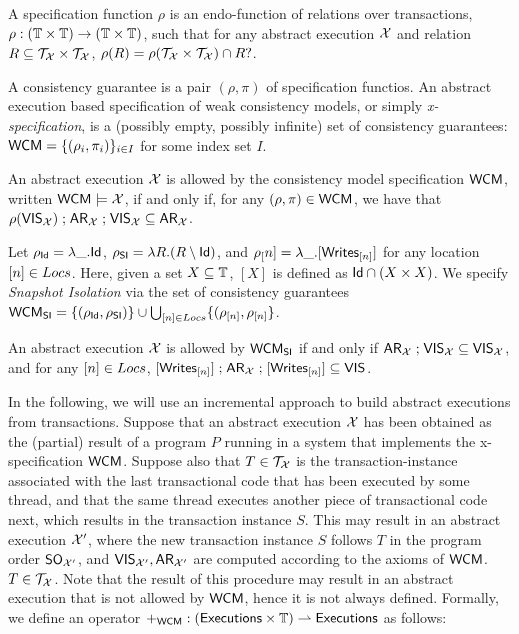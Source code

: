 \documentclass[a4paper,UKenglish]{article}%
\theoremstyle{plain}
\begin{document}
\begin{definition}
A specification function $\rho$ is an endo-function of relations over 
transactions, $\rho: (\mathbb{T} \times \mathbb{T}) \rightarrow (\mathbb{T} \times \mathbb{T})$,
such that for any abstract execution $\mathcal{X}$ and relation $R \subseteq \mathcal{T}_{\mathcal{X}} \times \mathcal{T}_{\mathcal{X}}$, 
$\rho(R) = \rho(\mathcal{T}_{\mathcal{X}} \times \mathcal{T}_{\mathcal{X}}) \cap R?$. 

A consistency guarantee is a pair $(\rho, \pi)$ of specification functios.
An abstract execution based specification of weak consistency models, or simply \emph{x-specification}, 
is a (possibly empty, possibly infinite) set of consistency guarantees: $\mathsf{WCM} = \{(\rho_i, \pi_i)\}_{i \in I}$ 
for some index set $I$.
\end{definition}

\begin{definition}
An abstract execution $\mathcal{X}$ is allowed by the consistency model specification $\mathsf{WCM}$, 
written $\mathsf{WCM} \models \mathcal{X}$, if and only if, for any $(\rho, \pi) \in \mathsf{WCM}$, we have that $\rho({\mathsf{VIS}}_{\mathcal{X}}) \mathrel{;} {\sf{AR}}_{\mathcal{X}} 
\mathrel{;} {\mathsf{VIS}}_{\mathcal{X}} \subseteq {\sf{AR}}_{\mathcal{X}}$.
\end{definition}

\begin{example}
Let $\rho_{\mathsf{Id}} = \lambda \_. \mathsf{Id}$, $\rho_{\mathsf{SI}} = \lambda R. (R \setminus \mathsf{Id})$, and $\rho_[n] = 
\lambda \_. [{\sf{Writes}}_{[n]}]$ for any location $[n] \in Locs$. Here, given a set $X \subseteq \mathbb{T}$, 
$[X]$ is defined as $\mathsf{Id} \cap (X \times X)$. We specify \emph{Snapshot Isolation} via the set 
of consistency guarantees $\mathsf{WCM}_{\mathsf{SI}} = \{(\rho_{\mathsf{Id}}, \rho_{\mathsf{SI}})\} \cup \bigcup_{[n] \in Locs} \{(\rho_{[n]}, \rho_{[n]}\}$. 

An abstract execution $\mathcal{X}$ is allowed by $\mathsf{WCM}_{\mathsf{SI}}$ if and only if 
${\sf{AR}}_{\mathcal{X}} \mathrel{;} {\mathsf{VIS}}_{\mathcal{X}} \subseteq {\mathsf{VIS}}_{\mathcal{X}}$, 
and for any $[n] \in Locs$, $[{\sf{Writes}}_{[n]}] \mathrel{;} {\sf{AR}}_{\mathcal{X}} \mathrel{;} [{\sf{Writes}}_{[n]}] \subseteq {\mathsf{VIS}}$.
\end{example}

In the following, we will use an incremental approach to build abstract executions from transactions. 
Suppose that an abstract execution $\mathcal{X}$ has been obtained as the (partial) result of a program $P$ running 
in a system that implements the x-specification $\mathsf{WCM}$. 
Suppose also that $T \in \mathcal{T}_{\mathcal{X}}$ is the transaction-instance associated with the last transactional 
code that has been executed by some thread, and that the same thread executes another piece of transactional 
code next, which results in the transaction instance $S$. This may result in an abstract execution $\mathcal{X}'$, 
where the new transaction instance $S$ follows $T$ in the program order ${\sf{SO}}_{\mathcal{X}'}$, and ${\mathsf{VIS}}_{\mathcal{X}'}, 
{\sf{AR}}_{\mathcal{X}'}$ are computed according to the axioms of $\mathsf{WCM}$.
$T \in \mathcal{T}_{\mathcal{X}}$. Note that the result of this procedure may result in an abstract execution that 
is not allowed by $\mathsf{WCM}$, hence it is not always defined.
Formally, we define an operator $+_{\mathsf{WCM}} : ({\mathsf{Executions}} \times \mathbb{T}) \rightharpoonup 
{\mathsf{Executions}}$ as follows:
\end{document}
